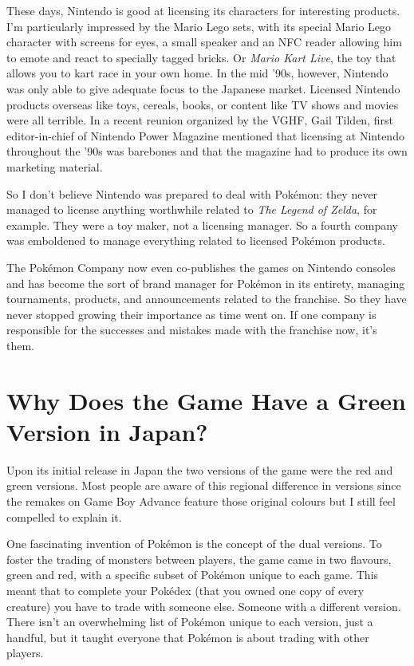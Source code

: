 \documentclass{book}
\begin{document}
These days, Nintendo is good at licensing its characters for interesting products. I’m particularly impressed by the Mario Lego sets, with its special Mario Lego character with screens for eyes, a small speaker and an NFC reader allowing him to emote and react to specially tagged bricks. Or \emph{Mario Kart Live}, the toy that allows you to kart race in your own home. In the mid ’90s, however, Nintendo was only able to give adequate focus to the Japanese market. Licensed Nintendo products overseas like toys, cereals, books, or content like TV shows and movies were all terrible. In a recent reunion organized by the VGHF, Gail Tilden, first editor-in-chief of Nintendo Power Magazine mentioned that licensing at Nintendo throughout the ’90s was barebones and that the magazine had to produce its own marketing material.

So I don’t believe Nintendo was prepared to deal with Pokémon: they never managed to license anything worthwhile related to \emph{The Legend of Zelda}, for example. They were a toy maker, not a licensing manager. So a fourth company was emboldened to manage everything related to licensed Pokémon products.

The Pokémon Company now even co-publishes the games on Nintendo consoles and has become the sort of brand manager for Pokémon in its entirety, managing tournaments, products, and announcements related to the franchise. So they have never stopped growing their importance as time went on. If one company is responsible for the successes and mistakes made with the franchise now, it’s them.

\FloatBarrier\needspace{10mm}\section*{Why Does the Game Have a Green Version in Japan?}\nopagebreak[4]

Upon its initial release in Japan the two versions of the game were the red and green versions. Most people are aware of this regional difference in versions since the remakes on Game Boy Advance feature those original colours but I still feel compelled to explain it.

One fascinating invention of Pokémon is the concept of the dual versions. To foster the trading of monsters between players, the game came in two flavours, green and red, with a specific subset of Pokémon unique to each game. This meant that to complete your Pokédex (that you owned one copy of every creature) you have to trade with someone else. Someone with a different version. There isn’t an overwhelming list of Pokémon unique to each version, just a handful, but it taught everyone that Pokémon is about trading with other players.
\end{document}
